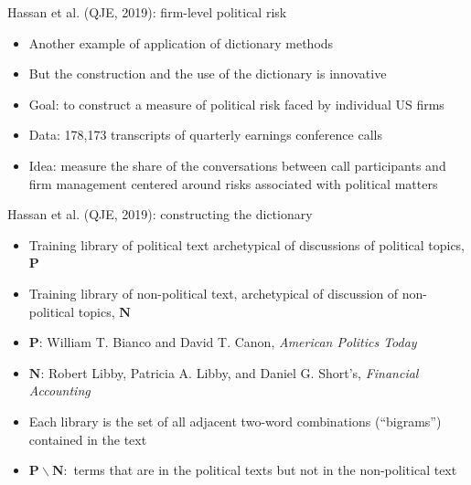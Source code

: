 \documentclass[english]{beamer}
\begin{document}

\begin{frame}{Hassan et al. (QJE, 2019): firm-level political risk}
\begin{itemize}
\setlength{\itemsep}{1.2em}
\item Another example of application of dictionary methods
\item But the construction and the use of the dictionary is innovative
\item Goal: to construct a measure of political risk faced by individual US firms
\item Data: 178,173 transcripts of quarterly earnings conference calls
\item Idea: measure the share of the conversations between call participants and firm management centered around risks associated with political matters
\end{itemize}
\end{frame}

\begin{frame}{Hassan et al. (QJE, 2019): constructing the dictionary}
\begin{itemize}
\setlength{\itemsep}{0.9em}
\item Training library of political text archetypical of discussions of political topics, $\mathbf{P}$
\item Training library of non-political text, archetypical of discussion of non-political topics, $\mathbf{N}$
\item $\mathbf{P}$: William T. Bianco and David T. Canon, \textit{American Politics Today}
\item $\mathbf{N}$: Robert Libby, Patricia A. Libby, and Daniel G. Short's, \textit{Financial Accounting}
\item Each library is the set of all adjacent two-word combinations (``bigrams'') contained in the text
\item $\boldsymbol{P}\backslash \boldsymbol{N}:$ terms that are in the political texts but not in the non-political text
\end{itemize}
\end{frame}
\end{document}
